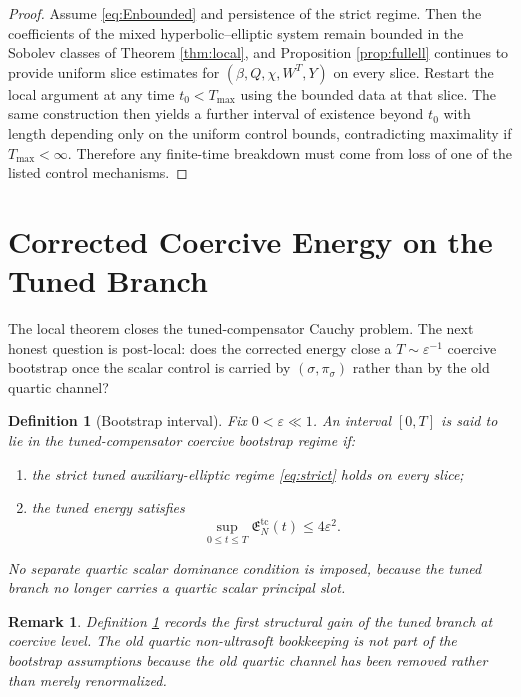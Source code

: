 \documentclass[11pt]{article}
\newtheorem{definition}{Definition}
\newtheorem{remark}{Remark}
\begin{document}
\begin{proof}
Assume \eqref{eq:Enbounded} and persistence of the strict regime. Then the coefficients of the mixed hyperbolic--elliptic system remain bounded in the Sobolev classes of Theorem \ref{thm:local}, and Proposition \ref{prop:fullell} continues to provide uniform slice estimates for \((\beta,Q,\chi,W^T,Y)\) on every slice. Restart the local argument at any time \(t_0<T_{\max}\) using the bounded data at that slice. The same construction then yields a further interval of existence beyond \(t_0\) with length depending only on the uniform control bounds, contradicting maximality if \(T_{\max}<\infty\). Therefore any finite-time breakdown must come from loss of one of the listed control mechanisms.
\end{proof}

\section{Corrected Coercive Energy on the Tuned Branch}

The local theorem closes the tuned-compensator Cauchy problem. The next honest question is post-local: does the corrected energy close a \(T\sim\varepsilon^{-1}\) coercive bootstrap once the scalar control is carried by \((\sigma,\pi_\sigma)\) rather than by the old quartic channel?

\begin{definition}[Bootstrap interval]
\label{def:boot}
Fix \(0<\varepsilon\ll 1\). An interval \([0,T]\) is said to lie in the \emph{tuned-compensator coercive bootstrap regime} if:
\begin{enumerate}
    \item the strict tuned auxiliary-elliptic regime \eqref{eq:strict} holds on every slice;
    \item the tuned energy satisfies
    \begin{equation}
    \sup_{0\le t\le T}\mathfrak E_N^{\mathrm{tc}}(t)\le 4\varepsilon^2.
    \label{eq:bootenergy}
    \end{equation}
\end{enumerate}
No separate quartic scalar dominance condition is imposed, because the tuned branch no longer carries a quartic scalar principal slot.
\end{definition}

\begin{remark}
Definition \ref{def:boot} records the first structural gain of the tuned branch at coercive level. The old quartic non-ultrasoft bookkeeping is not part of the bootstrap assumptions because the old quartic channel has been removed rather than merely renormalized.
\end{remark}
\end{document}
